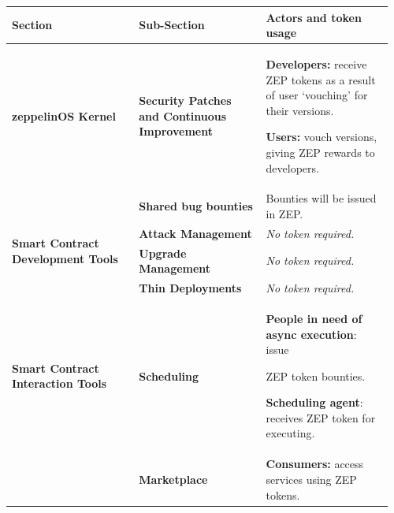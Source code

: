 \documentclass[]{article}
\makeatletter
\DeclareRobustCommand{\_}{%
  \leavevmode\vbox{%
    \hrule\@width.5em
          \@height-.26ex
          \@depth\dimexpr.26ex+.28pt\relax}}
\makeatother
\begin{document}
\begin{longtable}[]{@{}p{0.32\linewidth}p{0.32\linewidth}p{0.32\linewidth}@{}}
\toprule
\textbf{Section} & \textbf{Sub-Section} & \textbf{Actors and token
usage}\tabularnewline
\midrule
\endhead
\begin{minipage}[t]{0.32\columnwidth}\raggedright\strut
\textbf{zeppelinOS Kernel}\strut
\end{minipage} & \begin{minipage}[t]{0.32\columnwidth}\raggedright\strut
\textbf{Security Patches and Continuous Improvement}\strut
\end{minipage} & \begin{minipage}[t]{0.32\columnwidth}\raggedright\strut
\textbf{Developers:} receive ZEP tokens as a result of user `vouching'
for their versions.

\textbf{Users:} vouch versions, giving ZEP rewards to developers.\strut
\end{minipage}\tabularnewline\cmidrule{2-3}
& \textbf{Shared bug bounties} & Bounties will be issued in
ZEP.\tabularnewline\midrule
\multirow{2}{\linewidth}{\textbf{Smart Contract Development Tools}} & \textbf{Attack Management} &
\emph{No token required.}\tabularnewline\cmidrule{2-3}
& \textbf{Upgrade Management} & \emph{No token required.}\tabularnewline\cmidrule{2-3}
& \textbf{Thin Deployments} & \emph{No token required.}\tabularnewline\midrule
\begin{minipage}[t]{0.32\columnwidth}\raggedright\strut
\textbf{Smart Contract Interaction Tools}\strut
\end{minipage} & \begin{minipage}[t]{0.32\columnwidth}\raggedright\strut
\textbf{Scheduling}\strut
\end{minipage} & \begin{minipage}[t]{0.32\columnwidth}\raggedright\strut
\textbf{People in need of async execution}: issue

ZEP token bounties.

\textbf{Scheduling agent}: receives ZEP token for executing.\strut
\end{minipage}\tabularnewline\cmidrule{2-3}
\begin{minipage}[t]{0.32\columnwidth}\raggedright\strut
\strut
\end{minipage} & \begin{minipage}[t]{0.32\columnwidth}\raggedright\strut
\textbf{Marketplace}\strut
\end{minipage} & \begin{minipage}[t]{0.32\columnwidth}\raggedright\strut
\textbf{Consumers:} access services using ZEP tokens.


\end{minipage}
\end{longtable}
\end{document}
